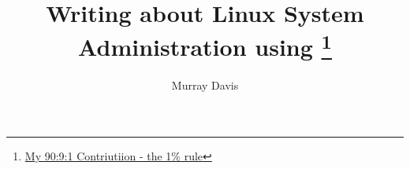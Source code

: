 \documentclass[twoside,letterpaper,11pt]{book}
\begin{document}

\pagestyle{empty}

\title{Writing about Linux System Administration using \latex\footnote{\href{https://en.wikipedia.org/wiki/1\%25_rule_(Internet_culture)}{My 90:9:1 Contriutiion - the  1\% rule}}\newline}




\author{Murray Davis}
\date{}
\maketitle

\pagestyle{plain}
% 
%
%
%
%
\setcounter{secnumdepth}{4} %
\setcounter{tocdepth}{4}    %

\tableofcontents



















\listoftodos
\listoffigures
\listoftables
\printindex
\end{document}
